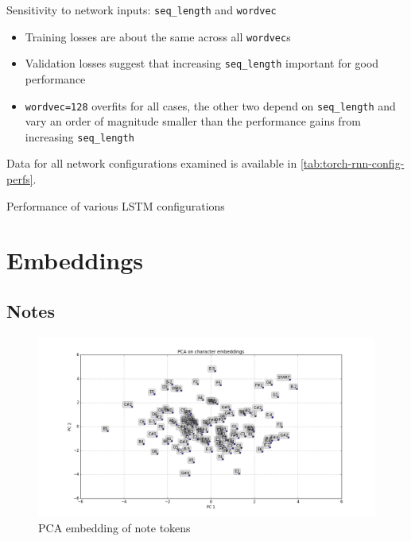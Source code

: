 \documentclass[dissertation.tex]{subfiles}
\begin{document}
Sensitivity to network inputs: \texttt{seq\_length} and \texttt{wordvec}
\begin{itemize}
    \item Training losses are about the same across all \texttt{wordvec}s
    \item Validation losses suggest that increasing \texttt{seq\_length} important for
        good performance 
    \item \texttt{wordvec=128} overfits for all cases, the other two depend on
        \texttt{seq\_length} and vary an order of magnitude smaller than the
        performance gains from increasing \texttt{seq\_length}
\end{itemize}

Data for all network configurations examined is available in \autoref{tab:torch-rnn-config-perfs}.

\begin{table}[htpb]
    \centering
    \caption{Performance of various LSTM configurations}
    \label{tab:torch-rnn-config-perfs}
    
\end{table}

\section{Embeddings}

\subsection{Notes}

\begin{figure}[htpb]
    \centering
    \includegraphics[width=0.8\linewidth]{Figures/PCA-notes.png}
    \caption{PCA embedding of note tokens}
    \label{fig:pca-notes}
\end{figure}
\end{document}
